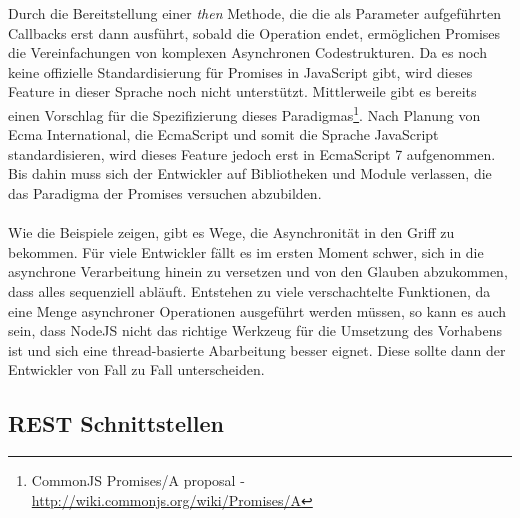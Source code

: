 Durch die Bereitstellung einer \textit{then} Methode, die die als Parameter aufgeführten Callbacks erst dann ausführt, sobald die Operation endet, ermöglichen Promises die Vereinfachungen von komplexen Asynchronen Codestrukturen. Da es noch keine offizielle Standardisierung für Promises in JavaScript gibt, wird dieses Feature in dieser Sprache noch nicht unterstützt. Mittlerweile gibt es bereits einen Vorschlag für die Spezifizierung dieses Paradigmas\footnote{CommonJS Promises/A proposal - \url{http://wiki.commonjs.org/wiki/Promises/A}}. Nach Planung von Ecma International, die EcmaScript und somit die Sprache JavaScript standardisieren, wird dieses Feature jedoch erst in EcmaScript 7 aufgenommen. Bis dahin muss sich der Entwickler auf Bibliotheken und Module verlassen, die das Paradigma der Promises versuchen abzubilden.\\
\\
Wie die Beispiele zeigen, gibt es Wege, die Asynchronität in den Griff zu bekommen. Für viele Entwickler fällt es im ersten Moment schwer, sich in die asynchrone Verarbeitung hinein zu versetzen und von den Glauben abzukommen, dass alles sequenziell abläuft. Entstehen zu viele verschachtelte Funktionen, da eine Menge asynchroner Operationen ausgeführt werden müssen, so kann es auch sein, dass NodeJS nicht das richtige Werkzeug für die Umsetzung des Vorhabens ist und sich eine thread-basierte Abarbeitung besser eignet. Diese sollte dann der Entwickler von Fall zu Fall unterscheiden.

\subsection{REST Schnittstellen}

